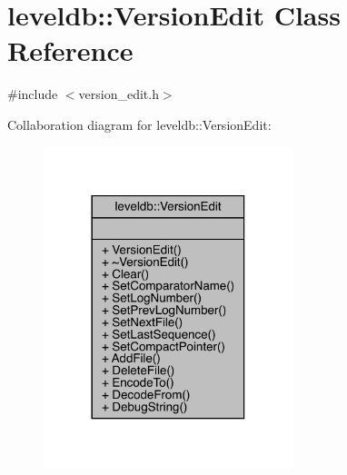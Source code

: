 \hypertarget{classleveldb_1_1_version_edit}{}\section{leveldb\+::Version\+Edit Class Reference}
\label{classleveldb_1_1_version_edit}


{\ttfamily \#include $<$version\+\_\+edit.\+h$>$}



Collaboration diagram for leveldb\+::Version\+Edit\+:
\nopagebreak
\begin{figure}[H]
\begin{center}
\leavevmode
\includegraphics[width=206pt]{classleveldb_1_1_version_edit__coll__graph}
\end{center}
\end{figure}
